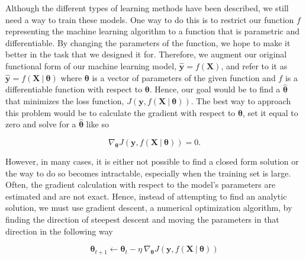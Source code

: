 Although the different types of learning methods have been described, we still need a way to train these models. One way to do this is to restrict our function $f$ representing the machine learning algorithm to a function that is parametric and differentiable. By changing the parameters of the function, we hope to make it better in the task that we designed it for. Therefore, we augment our original functional form of our machine learning model, $\mathbf{\hat{y}} = f(\mathbf{X})$, and refer to it as $\mathbf{\hat{y}} = f(\mathbf{X} \ | \ \boldsymbol{\theta})$  where $\boldsymbol{\theta}$ is a vector of parameters of the given function and $f$ is a differentiable function with respect to $\boldsymbol{\theta}$. Hence, our goal would be to find a $\boldsymbol{\hat{\theta}}$ that minimizes the loss function, $J(\mathbf{y}, f(\mathbf{X} \ | \ \boldsymbol{\theta}))$. The best way to approach this problem would be to calculate the gradient with respect to $\boldsymbol{\theta}$, set it equal to zero and solve for a $\boldsymbol{\hat{\theta}}$ like so

\begin{equation}
	\nabla_{\boldsymbol{\theta}} J(\mathbf{y}, f(\mathbf{X} \ | \ \boldsymbol{\theta})) = 0.
\end{equation}

However, in many cases, it is either not possible to find a closed form solution or the way to do so becomes intractable, especially when the training set is large. Often, the gradient calculation with respect to the model's parameters are estimated and are not exact. Hence, instead of attempting to find an analytic solution, we must use gradient descent, a numerical optimization algorithm, by finding the direction of steepest descent and moving the parameters in that direction in the following way 

\begin{equation}
	\label{eq:sgd}
	\boldsymbol{\theta}_{t+1} \leftarrow \boldsymbol{\theta}_t - \eta \ \nabla_{\boldsymbol{\theta}} J(\mathbf{y}, f(\mathbf{X} \ | \ \boldsymbol{\theta})) 
\end{equation}

